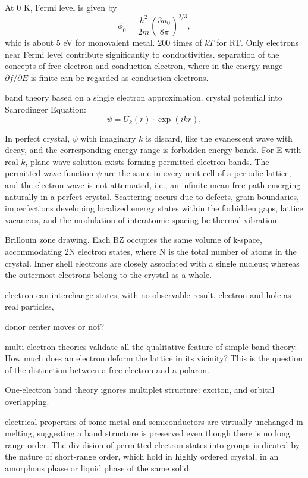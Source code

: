 At 0 K, Fermi level is given by 
\[
\phi_0 = \frac{h^2}{2m}(\frac{3n_0}{8\pi})^{2/3},
\]
whic is about 5 eV for monovalent metal. 200 times of $kT$ for RT. Only electrons near Fermi level contribute significantly to conductivities. separation of the concepts of free electron and conduction electron, where in the energy range $\partial f/\partial E$ is finite can be regarded as conduction electrons. 

band theory based on a single electron approximation. crystal potential into Schrodinger Equation:
\[
\psi = U_k(r)\cdot\exp(ikr),
\]

In perfect crystal, $\psi$ with imaginary $k$ is discard, like the evanescent wave with decay, and the corresponding energy range is forbidden energy bands. For E with real $k$, plane wave solution exists forming permitted electron bands. The permitted wave function $\psi$ are the same in every unit cell of a periodic lattice, and the electron wave is not attenuated, i.e., an infinite mean free path emerging naturally in a perfect crystal. Scattering occurs due to defects, grain boundaries, imperfections developing localized energy states within the forbidden gaps, lattice vacancies, and the modulation of interatomic spacing be thermal vibration. 

Brillouin zone drawing. Each BZ occupies the same volume of k-space, accommodating 2N electron states, where N is the total number of atoms in the crystal. Inner shell electrons are closely associated with a single nucleus; whereas the outermost electrons belong to the crystal as a whole. 

electron can interchange states, with no observable result. electron and hole as real particles, 

donor center moves or not? 

multi-electron theories validate all the qualitative feature of simple band theory. How much does an electron deform the lattice in its vicinity? This is the question of the distinction between a free electron and a polaron. 

One-electron band theory ignores multiplet structure: exciton, and orbital overlapping. 

electrical properties of some metal and semiconductors are virtually unchanged in melting, suggesting a band structure is preserved even though there is no long range order. The dividision of permitted electron states into groups is dicated by the nature of short-range order, which hold in highly ordered crystal, in an amorphous phase or liquid phase of the same solid. 

